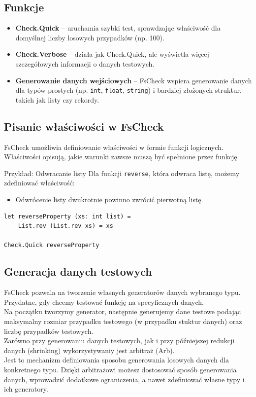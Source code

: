 \subsection{Funkcje}
\begin{itemize}
    \item \textbf{Check.Quick} -- uruchamia szybki test, sprawdzając właściwość dla domyślnej liczby losowych przypadków (np. 100).
    \item \textbf{Check.Verbose} -- działa jak Check.Quick, ale wyświetla więcej szczegółowych informacji o danych testowych.
    \item \textbf{Generowanie danych wejściowych} -- FsCheck wspiera generowanie danych dla typów prostych (np. \texttt{int}, \texttt{float}, \texttt{string}) i bardziej złożonych struktur, takich jak listy czy rekordy.
\end{itemize}

\subsection{Pisanie właściwości w FsCheck}

FsCheck umożliwia definiowanie właściwości w formie funkcji logicznych. Właściwości opisują, jakie warunki zawsze muszą być spełnione przez funkcję.

Przykład: Odwracanie listy
Dla funkcji \texttt{reverse}, która odwraca listę, możemy zdefiniować właściwość:
\begin{itemize}
    \item Odwrócenie listy dwukrotnie powinno zwrócić pierwotną listę.
\end{itemize}

\lstset{language=FSharp, basicstyle=\scriptsize}
\begin{lstlisting}[frame=single,caption={Definicja właściwości dla odwracania listy},label=kod:listingA]
let reverseProperty (xs: int list) =
    List.rev (List.rev xs) = xs

Check.Quick reverseProperty
\end{lstlisting}

\subsection{Generacja danych testowych}

FsCheck pozwala na tworzenie własnych generatorów danych wybranego typu. Przydatne, gdy chcemy testować funkcję na specyficznych danych. \\
Na początku tworzymy generator, następnie generujemy dane testowe podając maksymalny rozmiar przypadku testowego (w przypadku stuktur danych) oraz liczbę przypadków testowych.\\
Zarówno przy generowaniu danych testowych, jak i przy późniejszej redukcji danych (shrinking) wykorzystywaniy jest arbitraż (Arb).\\
Jest to mechanizm definiowania sposobu generowania losowych danych dla konkretnego typu. Dzięki arbitrażowi możesz dostosować sposób generowania danych, wprowadzić dodatkowe ograniczenia, a nawet zdefiniować własne typy i ich generatory.

